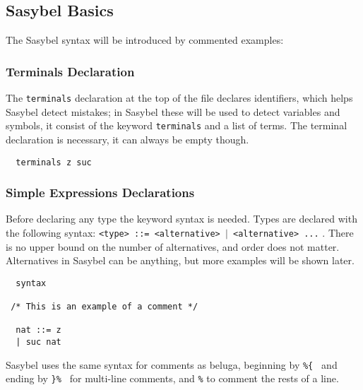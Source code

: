 \documentclass[12pt]{article}
\begin{document}
\subsection{Sasybel Basics}

The \textmd{Sasybel} syntax will be introduced by commented examples:
\subsubsection{Terminals Declaration}
The {\tt terminals} declaration at the top of the file declares identifiers, which helps \textmd{Sasybel} detect mistakes; in \textmd{Sasybel} these
will be used to detect variables and symbols, it consist of the keyword {\tt terminals} and a list of terms.
The terminal declaration is necessary, it can always be empty though.
\begin{verbatim}
  terminals z suc
\end{verbatim}
\subsubsection{Simple Expressions Declarations}
Before declaring any type the keyword syntax is needed. Types are declared with the following syntax: {\tt <type> ::= <alternative> $\vert$ <alternative> ...} . There is no upper bound
on the number of alternatives, and order does not matter. Alternatives in \textmd{Sasybel} can be anything, but more examples will be shown later.
\begin{verbatim}
  syntax

 /* This is an example of a comment */

  nat ::= z
  | suc nat

\end{verbatim}
\textmd{Sasybel} uses the same syntax for comments as beluga, beginning by {\tt \%\{ } and ending by {\tt \}\% } for multi-line comments, and {\tt \%} to comment the rests of a line.
\end{document}
